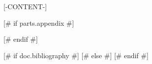 \documentclass[qe,nameyear,draft]{econsocart}
[# elif options.final #]
\theoremstyle{plain}
\begin{document}
[-CONTENT-]

[# if parts.appendix #]
\begin{appendix}
\end{appendix}
[# endif #]

[# if doc.bibliography #]
[# else #]
[# endif #]
\end{document}
